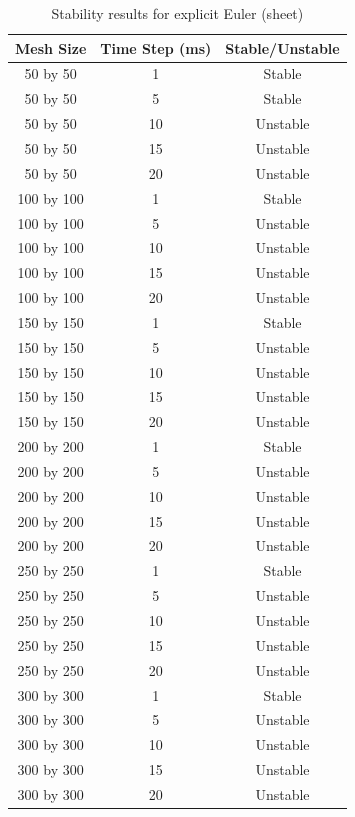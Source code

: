 \begin{table}[tp]
   \begin{minipage}{\textwidth}
      \begin{center}
         \begin{tabular}{|c|c|c|} \hline
           Mesh Size & Time Step (ms) & Stable/Unstable\\
           \hline
           50 by 50 & 1 & Stable\\ \hline
           50 by 50 & 5 & Stable\\ \hline
           50 by 50 & 10 & Unstable\\ \hline
           50 by 50 & 15 & Unstable\\ \hline
           50 by 50 & 20 & Unstable\\ \hline
           100 by 100 & 1 & Stable\\ \hline
           100 by 100 & 5 & Unstable\\ \hline
           100 by 100 & 10 & Unstable\\ \hline
           100 by 100 & 15 & Unstable\\ \hline
           100 by 100 & 20 & Unstable\\ \hline           
           150 by 150 & 1 & Stable\\ \hline
           150 by 150 & 5 & Unstable\\ \hline
           150 by 150 & 10 & Unstable\\ \hline
           150 by 150 & 15 & Unstable\\ \hline
           150 by 150 & 20 & Unstable\\ \hline           
           200 by 200 & 1 & Stable\\ \hline
           200 by 200 & 5 & Unstable\\ \hline
           200 by 200 & 10 & Unstable\\ \hline
           200 by 200 & 15 & Unstable\\ \hline
           200 by 200 & 20 & Unstable\\ \hline           
           250 by 250 & 1 & Stable\\ \hline
           250 by 250 & 5 & Unstable\\ \hline
           250 by 250 & 10 & Unstable\\ \hline
           250 by 250 & 15 & Unstable\\ \hline
           250 by 250 & 20 & Unstable\\ \hline           
           300 by 300 & 1 & Stable\\ \hline
           300 by 300 & 5 & Unstable\\ \hline
           300 by 300 & 10 & Unstable\\ \hline
           300 by 300 & 15 & Unstable\\ \hline
           300 by 300 & 20 & Unstable\\ \hline
         \end{tabular}
      \end{center}
   \end{minipage}
   \caption{Stability results for explicit Euler (sheet)}
   \label{tab:ee stability sheet}
\end{table}

